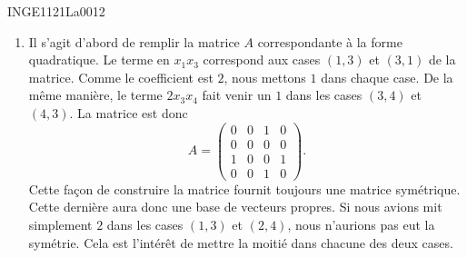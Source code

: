 
\begin{corrige}{INGE1121La0012}

	\begin{enumerate}

		\item
			Il s'agit d'abord de remplir la matrice $A$ correspondante à la forme quadratique. Le terme en $x_1x_3$ correspond aux cases $(1,3)$ et $(3,1)$ de la matrice. Comme le coefficient est $2$, nous mettons $1$ dans chaque case. De la même manière, le terme $2x_3x_4$ fait venir un $1$ dans les cases $(3,4)$ et $(4,3)$. La matrice est donc
			\begin{equation}
				A=\begin{pmatrix}
					 0	&	0	&	1	&	0	\\
					 0	&	0	&	0	&	0	\\
					 1	&	0	&	0	&	1	\\ 
					 0	&	0	&	1	&	0	 
					  \end{pmatrix}.
			\end{equation}
			Cette façon de construire la matrice fournit toujours une matrice symétrique. Cette dernière aura donc une base de vecteurs propres. Si nous avions mit simplement $2$ dans les cases $(1,3)$ et $(2,4)$, nous n'aurions pas eut la symétrie. Cela est l'intérêt de mettre la moitié dans chacune des deux cases.


\end{enumerate}
\end{corrige}
